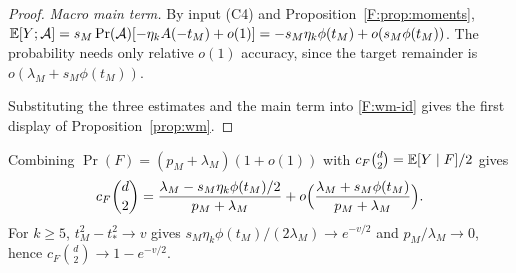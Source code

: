 \begin{proof}
\emph{Macro main term.} By input (C4) and Proposition~\ref{F:prop:moments},
$\mathbb E[Y;\mathcal A]=s_M\Pr(\mathcal A)[-\eta_kA(-t_M)+o(1)]=-s_M\eta_k\phi(t_M)+o(s_M\phi(t_M))$.
The probability needs only relative $o(1)$ accuracy, since the target remainder is
$o(\lambda_M+s_M\phi(t_M))$.

Substituting the three estimates and the main term into \eqref{F:wm-id} gives the first display of
Proposition~\ref{prop:wm}.
\end{proof}

Combining $\Pr(F)=(p_M+\lambda_M)(1+o(1))$ with $c_F\binom d2=\mathbb E[Y\mid F]/2$ gives
\begin{equation*}
c_F\binom d2=\frac{\lambda_M-s_M\eta_k\phi(t_M)/2}{p_M+\lambda_M}+o\Bigl(\frac{\lambda_M+s_M\phi(t_M)}{p_M+\lambda_M}\Bigr).
\end{equation*}
For $k\ge5$, $t_M^2-t_*^2\to v$ gives
$s_M\eta_k\phi(t_M)/(2\lambda_M)\to e^{-v/2}$ and $p_M/\lambda_M\to0$, hence
$c_F\binom d2\to1-e^{-v/2}$.
